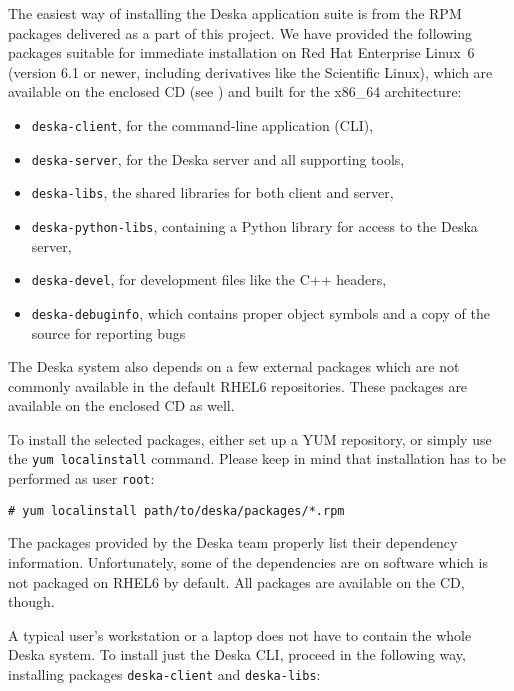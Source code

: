 \documentclass[deska]{subfiles}
\begin{document}

The easiest way of installing the Deska application suite is from the RPM packages delivered as a part of this project.
We have provided the following packages suitable for immediate installation on Red Hat Enterprise Linux~6 \cite{rhel}
(version 6.1 or newer, including derivatives like the Scientific Linux), which are available on the enclosed CD (see
) and built for the x86\_64 architecture:

\begin{itemize}
    \item {\tt deska-client}, for the command-line application (CLI),
    \item {\tt deska-server}, for the Deska server and all supporting tools,
    \item {\tt deska-libs}, the shared libraries for both client and server,
    \item {\tt deska-python-libs}, containing a Python library for access to the Deska server,
    \item {\tt deska-devel}, for development files like the C++ headers,
    \item {\tt deska-debuginfo}, which contains proper object symbols and a copy of the source for reporting bugs
\end{itemize}

The Deska system also depends on a few external packages which are not commonly available in the default RHEL6
repositories.  These packages are available on the enclosed CD as well.

To install the selected packages, either set up a YUM repository, or simply use the {\tt yum localinstall} command.
Please keep in mind that installation has to be performed as user {\tt root}:

\begin{verbatim}
# yum localinstall path/to/deska/packages/*.rpm
\end{verbatim}

The packages provided by the Deska team properly list their dependency information.  Unfortunately, some of the
dependencies are on software which is not packaged on RHEL6 by default.  All packages are available on the CD, though.

A typical user's workstation or a laptop does not have to contain the whole Deska system.  To install just the Deska
CLI, proceed in the following way, installing packages {\tt deska-client} and {\tt deska-libs}:
\end{document}
